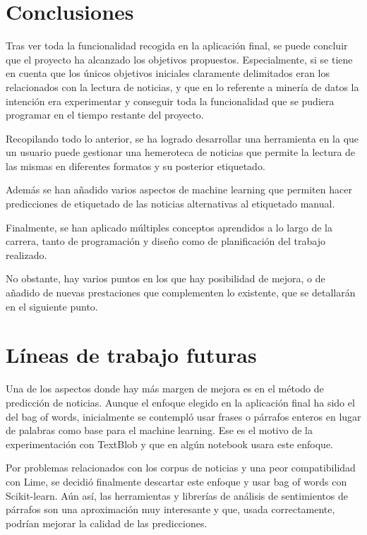 
\section{Conclusiones}

Tras ver toda la funcionalidad recogida en la aplicación final, se puede concluir que el proyecto ha alcanzado los objetivos propuestos. Especialmente, si se tiene en cuenta que los únicos objetivos iniciales claramente delimitados eran los relacionados con la lectura de noticias, y que en lo referente a minería de datos la intención era experimentar y conseguir toda la funcionalidad que se pudiera programar en el tiempo restante del proyecto.

Recopilando todo lo anterior, se ha logrado desarrollar una herramienta en la que un usuario puede gestionar una hemeroteca de noticias que permite la lectura de las mismas en diferentes formatos y su posterior etiquetado.

Además se han añadido varios aspectos de machine learning que permiten hacer predicciones de etiquetado de las noticias alternativas al etiquetado manual.

Finalmente, se han aplicado múltiples conceptos aprendidos a lo largo de la carrera, tanto de programación y diseño como de planificación del trabajo realizado.

No obstante, hay varios puntos en los que hay posibilidad de mejora, o de añadido de nuevas prestaciones que complementen lo existente, que se detallarán en el siguiente punto.

\section{Líneas de trabajo futuras}

Una de los aspectos donde hay más margen de mejora es en el método de predicción de noticias. Aunque el enfoque elegido en la aplicación final ha sido el del bag of words, inicialmente se contempló usar frases o párrafos enteros en lugar de palabras como base para el machine learning. Ese es el motivo de la experimentación con TextBlob y que en algún notebook usara este enfoque. 

Por problemas relacionados con los corpus de noticias y una peor compatibilidad con Lime, se decidió finalmente descartar este enfoque y usar bag of words con Scikit-learn. Aún así, las herramientas y librerías de análisis de sentimientos de párrafos son una aproximación muy interesante y que, usada correctamente, podrían mejorar la calidad de las predicciones.

